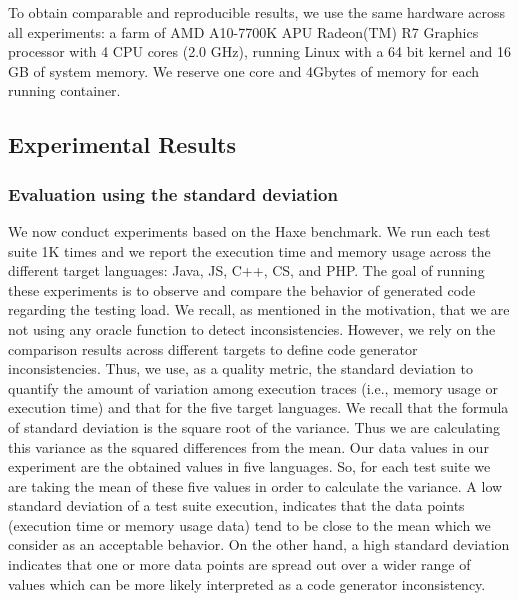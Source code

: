 To obtain comparable and reproducible results, we use the same hardware across all experiments: a farm of AMD A10-7700K APU Radeon(TM) R7 Graphics processor with 4 CPU cores (2.0 GHz), running Linux with a 64 bit kernel and 16 GB of system memory. We reserve one core and 4Gbytes of memory for each running container. 

\subsection{Experimental Results}
\subsubsection{Evaluation using the standard deviation}
We now conduct experiments based on the Haxe benchmark. We run each test suite 1K times and we report the execution time and memory usage across the different target languages: Java, JS, C++, CS, and PHP. 
The goal of running these experiments is to observe and compare the behavior of generated code regarding the testing load. We recall, as mentioned in the motivation, that we are not using any oracle function to detect inconsistencies. However, we rely on the comparison results across different targets to define code generator inconsistencies.
Thus, we use, as a quality metric, the standard deviation to quantify the amount of variation among execution traces (i.e., memory usage or execution time) and that for the five target languages. We recall that the formula of standard deviation is the square root of the variance. Thus we are calculating this variance as the squared differences from the mean. Our data values in our experiment are the obtained values in five languages. So, for each test suite we are taking the mean of these five values in order to calculate the variance.
A low standard deviation of a test suite execution, indicates that the data points (execution time or memory usage data) tend to be close to the mean which we consider as an acceptable behavior.  
On the other hand, a high standard deviation indicates that one or more data points are spread out over a wider range of values which can be more likely interpreted as a code generator inconsistency. 



